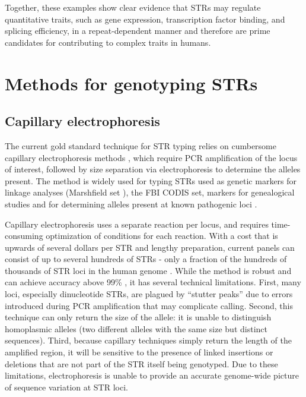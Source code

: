 Together, these examples show clear evidence that STRs may regulate quantitative traits, such as gene expression, transcription factor binding, and splicing efficiency, in a repeat-dependent manner and therefore are prime candidates for contributing to complex traits in humans.

\section{Methods for genotyping STRs}
\label{sec:intromethods}
\subsection{Capillary electrophoresis}
The current gold standard technique for STR typing relies on cumbersome capillary electrophoresis methods \cite{ButlerBuelCrivellenteEtAl2004}, which require PCR amplification of the locus of interest, followed by size separation via electrophoresis to determine the alleles present. The method is widely used for typing STRs used as genetic markers for linkage analyses (Marshfield set \cite{BromanMurraySheffieldEtAl1998}), the FBI CODIS set, markers for genealogical studies \cite{ZerjalXueBertorelleEtAl2003,SkoreckiSeligBlazerEtAl1997} and for determining alleles present at known pathogenic loci \cite{LyonLaverYuEtAl2010,BlancoSuarezGandia-PlaEtAl2008}.

Capillary electrophoresis uses a separate reaction per locus, and requires time-consuming optimization of conditions for each reaction. With a cost that is upwards of several dollars per STR and lengthy preparation, current panels can consist of up to several hundreds of STRs - only a fraction of the hundreds of thousands of STR loci in the human genome \cite{Benson1999}. While the method is robust and can achieve accuracy above 99\% \cite{WeberBroman2001}, it has several technical limitations. First, many loci, especially dinucleotide STRs, are plagued by ``stutter peaks'' due to errors introduced during PCR amplification that may complicate calling. Second, this technique can only return the size of the allele: it is unable to distinguish homoplasmic alleles \cite{WeberBroman2001} (two different alleles with the same size but distinct sequences). Third, because capillary techniques simply return the length of the amplified region, it will be sensitive to the presence of linked insertions or deletions that are not part of the STR itself being genotyped. Due to these limitations, electrophoresis is unable to provide an accurate genome-wide picture of sequence variation at STR loci.

